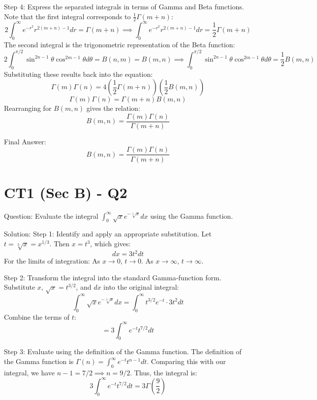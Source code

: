 \documentclass[11pt, a4paper]{article}
\begin{document}
Step 4: Express the separated integrals in terms of Gamma and Beta functions.
Note that the first integral corresponds to \(\frac{1}{2}\Gamma(m+n)\):
\[
2 \int_{0}^{\infty} e^{-r^2} r^{2(m+n)-1} dr = \Gamma(m+n) \implies \int_{0}^{\infty} e^{-r^2} r^{2(m+n)-1} dr = \frac{1}{2}\Gamma(m+n)
\]
The second integral is the trigonometric representation of the Beta function:
\[
2 \int_{0}^{\pi/2} \sin^{2n-1}\theta \cos^{2m-1}\theta d\theta = B(n, m) = B(m, n) \implies \int_{0}^{\pi/2} \sin^{2n-1}\theta \cos^{2m-1}\theta d\theta = \frac{1}{2} B(m, n)
\]
Substituting these results back into the equation:
\[
\Gamma(m)\Gamma(n) = 4 \left( \frac{1}{2}\Gamma(m+n) \right) \left( \frac{1}{2} B(m, n) \right)
\]
\[
\Gamma(m)\Gamma(n) = \Gamma(m+n) B(m, n)
\]
Rearranging for \(B(m, n)\) gives the relation:
\[
B(m, n) = \frac{\Gamma(m)\Gamma(n)}{\Gamma(m+n)}
\]

Final Answer:
\[
\boxed{B(m, n) = \frac{\Gamma(m)\Gamma(n)}{\Gamma(m+n)}}
\]


\section*{CT1 (Sec B) - Q2}
Question:
Evaluate the integral \(\int_{0}^{\infty} \sqrt{x} e^{-\sqrt[3]{x}} dx\) using the Gamma function.

Solution:
Step 1: Identify and apply an appropriate substitution.
Let \(t = \sqrt[3]{x} = x^{1/3}\).
Then \(x = t^3\), which gives:
\[
dx = 3t^2 dt
\]
For the limits of integration:
As \(x \to 0\), \(t \to 0\).
As \(x \to \infty\), \(t \to \infty\).

Step 2: Transform the integral into the standard Gamma-function form.
Substitute \(x\), \(\sqrt{x} = t^{3/2}\), and \(dx\) into the original integral:
\[
\int_{0}^{\infty} \sqrt{x} e^{-\sqrt[3]{x}} dx = \int_{0}^{\infty} t^{3/2} e^{-t} \cdot 3t^2 dt
\]
Combine the terms of \(t\):
\[
= 3 \int_{0}^{\infty} e^{-t} t^{7/2} dt
\]

Step 3: Evaluate using the definition of the Gamma function.
The definition of the Gamma function is \(\Gamma(n) = \int_{0}^{\infty} e^{-t} t^{n-1} dt\).
Comparing this with our integral, we have \(n-1 = 7/2 \implies n = 9/2\).
Thus, the integral is:
\[
3 \int_{0}^{\infty} e^{-t} t^{7/2} dt = 3 \Gamma\left(\frac{9}{2}\right)
\]
\end{document}
